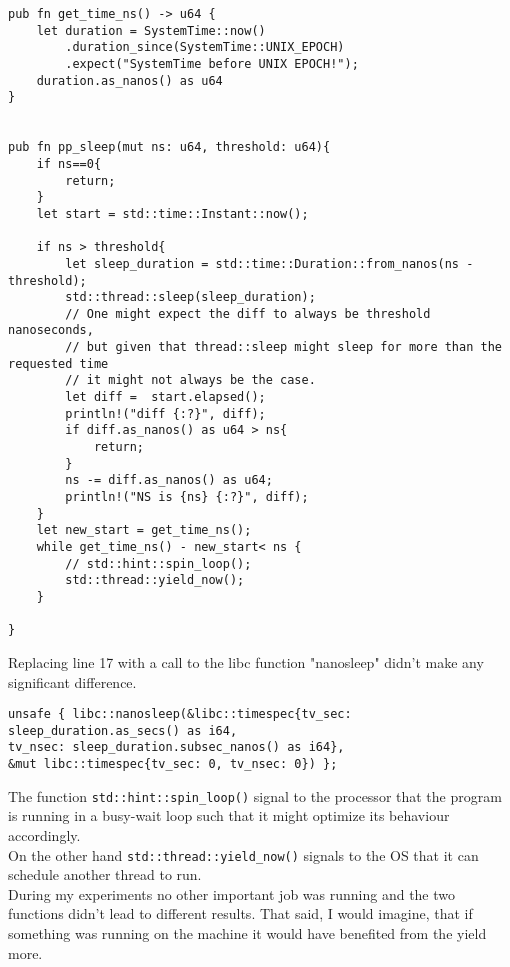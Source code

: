 \documentclass{article}
\begin{document}
\begin{verbatim}
pub fn get_time_ns() -> u64 {
    let duration = SystemTime::now()
        .duration_since(SystemTime::UNIX_EPOCH)
        .expect("SystemTime before UNIX EPOCH!");
    duration.as_nanos() as u64
}


pub fn pp_sleep(mut ns: u64, threshold: u64){
    if ns==0{
        return;
    }
    let start = std::time::Instant::now();

    if ns > threshold{
        let sleep_duration = std::time::Duration::from_nanos(ns - threshold);
        std::thread::sleep(sleep_duration);
        // One might expect the diff to always be threshold nanoseconds,
        // but given that thread::sleep might sleep for more than the requested time
        // it might not always be the case.
        let diff =  start.elapsed();
        println!("diff {:?}", diff);
        if diff.as_nanos() as u64 > ns{
            return;
        }
        ns -= diff.as_nanos() as u64;
        println!("NS is {ns} {:?}", diff);
    }
    let new_start = get_time_ns();
    while get_time_ns() - new_start< ns {
        // std::hint::spin_loop();
        std::thread::yield_now();
    }

}
\end{verbatim}

Replacing line 17 with a call to the libc function "nanosleep" didn't make any significant difference.
\begin{verbatim}
unsafe { libc::nanosleep(&libc::timespec{tv_sec: sleep_duration.as_secs() as i64,
tv_nsec: sleep_duration.subsec_nanos() as i64},
&mut libc::timespec{tv_sec: 0, tv_nsec: 0}) };
\end{verbatim}

The function \texttt{std::hint::spin_loop()} signal to the processor that the program is running in a busy-wait loop such that it might optimize its behaviour accordingly.\\
On the other hand \texttt{std::thread::yield_now()} signals to the OS that it can schedule another thread to run.\\
During my experiments no other important job was running and the two functions didn't lead to different results. That said, I would imagine, that if something was running on the machine it would have benefited from the yield more.
\end{document}
